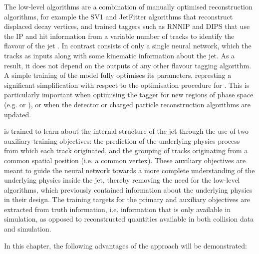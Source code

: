 The low-level algorithms are a combination of manually optimised reconstruction algorithms, for example the SV1 and JetFitter algorithms that reconstruct displaced decay vertices, and trained taggers such as RNNIP and DIPS that use the IP and hit information from a variable number of tracks to identify the flavour of the jet \cite{FTAG-2018-01,ATL-PHYS-PUB-2017-011,ATL-PHYS-PUB-2017-003,ATL-PHYS-PUB-2020-014}.
In contrast \GNN consists of only a single neural network, which the tracks as inputs along with some kinematic information about the jet.
As a result, it does not depend on the outputs of any other flavour tagging algorithm.
A simple training of the model fully optimises its parameters, represting a significant simplification with respect to the optimisation procedure for \DLr.
This is particularly important when optimising the tagger for new regions of phase space (e.g. \ctag or \highpt \btag), or when the detector or charged particle reconstruction algorithms are updated.

\GNN is trained to learn about the internal structure of the jet through the use of two auxiliary training objectives: the prediction of the underlying physics process from which each track originated, and the grouping of tracks originating from a common spatial position (i.e. a common vertex).
These auxiliary objectives are meant to guide the neural network towards a more complete understanding of the underlying physics inside the jet, thereby removing the need for the low-level algorithms, which previously contained information about the underlying physics in their design.
The training targets for the primary and auxiliary objectives are extracted from truth information, i.e. information that is only available in simulation, as opposed to reconstructed quantities available in both collision data and simulation.

In this chapter, the following advantages of the \GNN approach will be demonstrated:

